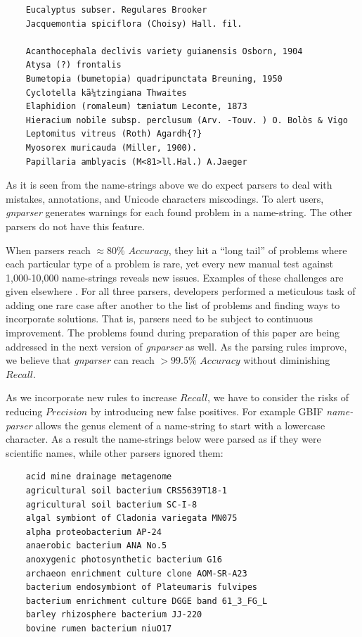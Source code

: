\documentclass{bmcart}
\begin{document}
\vspace{0.5cm}

\begin{verbatim}
    Eucalyptus subser. Regulares Brooker
    Jacquemontia spiciflora (Choisy) Hall. fil.

    Acanthocephala declivis variety guianensis Osborn, 1904
    Atysa (?) frontalis
    Bumetopia (bumetopia) quadripunctata Breuning, 1950
    Cyclotella kã¼tzingiana Thwaites
    Elaphidion (romaleum) tæniatum Leconte, 1873
    Hieracium nobile subsp. perclusum (Arv. -Touv. ) O. Bolòs & Vigo
    Leptomitus vitreus (Roth) Agardh{?}
    Myosorex muricauda (Miller, 1900).
    Papillaria amblyacis (M<81>ll.Hal.) A.Jaeger
\end{verbatim}

\vspace{0.5cm}

As it is seen from the name-strings above we do expect parsers to deal with
mistakes, annotations, and Unicode characters miscodings. To alert users,
\textit{gnparser} generates warnings for each found problem in a name-string.
The other parsers do not have this feature.

When parsers reach $\approx80\%$ $Accuracy$, they hit a ``long tail'' of
problems where each particular type of a problem  is rare, yet every new manual
test against 1,000-10,000 name-strings reveals new issues.  Examples of these
challenges are given elsewhere \cite{Patterson:inpress-a}. For all three
parsers, developers performed a meticulous task of adding one rare case after
another to the list of problems and finding ways to incorporate solutions. That
is, parsers need to be subject to continuous improvement. The problems found
during preparation of this paper are being addressed in the next version of
\textit{gnparser} as well. As the parsing rules improve, we believe that
\textit{gnparser} can reach $>99.5\%$ $Accuracy$ without diminishing $Recall$.

As we incorporate new rules to increase $Recall$, we have to consider the risks
of reducing $Precision$ by introducing new false positives. For example GBIF
\textit{name-parser} allows the genus element of a name-string to start with a
lowercase character. As a result the name-strings below were parsed as if they
were scientific names, while other parsers ignored them:

\vspace{0.5cm}

\begin{verbatim}
    acid mine drainage metagenome
    agricultural soil bacterium CRS5639T18-1
    agricultural soil bacterium SC-I-8
    algal symbiont of Cladonia variegata MN075
    alpha proteobacterium AP-24
    anaerobic bacterium ANA No.5
    anoxygenic photosynthetic bacterium G16
    archaeon enrichment culture clone AOM-SR-A23
    bacterium endosymbiont of Plateumaris fulvipes
    bacterium enrichment culture DGGE band 61_3_FG_L
    barley rhizosphere bacterium JJ-220
    bovine rumen bacterium niuO17
\end{verbatim}
\end{document}
